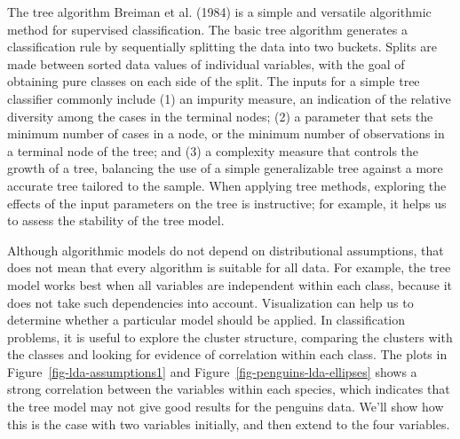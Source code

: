 \documentclass[
  letterpaper,
]{book}
\begin{document}
The tree algorithm Breiman et al. (1984) is a simple and versatile
algorithmic method for supervised classification. The basic tree
algorithm generates a classification rule by sequentially splitting the
data into two buckets. Splits are made between sorted data values of
individual variables, with the goal of obtaining pure classes on each
side of the split. The inputs for a simple tree classifier commonly
include (1) an impurity measure, an indication of the relative diversity
among the cases in the terminal nodes; (2) a parameter that sets the
minimum number of cases in a node, or the minimum number of observations
in a terminal node of the tree; and (3) a complexity measure that
controls the growth of a tree, balancing the use of a simple
generalizable tree against a more accurate tree tailored to the sample.
When applying tree methods, exploring the effects of the input
parameters on the tree is instructive; for example, it helps us to
assess the stability of the tree model.

Although algorithmic models do not depend on distributional assumptions,
that does not mean that every algorithm is suitable for all data. For
example, the tree model works best when all variables are independent
within each class, because it does not take such dependencies into
account. Visualization can help us to determine whether a particular
model should be applied. In classification problems, it is useful to
explore the cluster structure, comparing the clusters with the classes
and looking for evidence of correlation within each class. The plots in
Figure~\ref{fig-lda-assumptions1} and
Figure~\ref{fig-penguins-lda-ellipses} shows a strong correlation
between the variables within each species, which indicates that the tree
model may not give good results for the penguins data. We'll show how
this is the case with two variables initially, and then extend to the
four variables.
\end{document}
